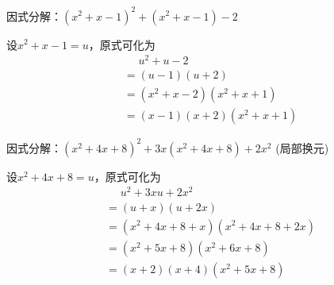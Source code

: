 \documentclass[windows,csize4,answers]{BHCexam}
\begin{document}
\begin{groups}

    \begin{questions}[]
        \question[5]因式分解：$(x^2+x-1)^2+(x^2+x-1)-2$
        \begin{solution}{0.5cm}
            \methodonly 设$x^2+x-1=u$，原式可化为
            \[
                \begin{aligned}
                     & \phantom{=}u^2+u-2   \\
                     & =(u-1)(u+2)          \\
                     & =(x^2+x-2)(x^2+x+1)  \\
                     & =(x-1)(x+2)(x^2+x+1)
                \end{aligned}
            \]
        \end{solution}
        \vspace{3.5cm}

        \question[5]因式分解：$(x^2+4x+8)^2+3x(x^2+4x+8)+2x^2$ (局部换元)
        \begin{solution}{0.5cm}
            \methodonly 设$x^2+4x+8=u$，原式可化为
            \[
                \begin{aligned}
                     & \phantom{=}u^2+3xu+2x^2    \\
                     & =(u+x)(u+2x)               \\
                     & =(x^2+4x+8+x)(x^2+4x+8+2x) \\
                     & =(x^2+5x+8)(x^2+6x+8)      \\
                     & = (x+2)(x+4)(x^2+5x+8)
                \end{aligned}
            \]
        \end{solution}
        \vspace{3.5cm}


\end{questions}
\end{groups}
\end{document}
